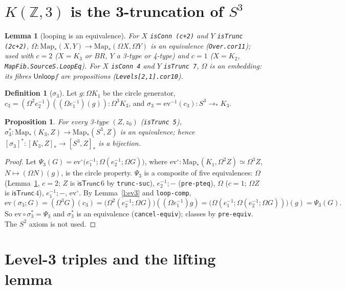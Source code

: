 \documentclass[11pt]{amsart}
\newtheorem{proposition}[theorem]{Proposition}
\newtheorem{lemma}[theorem]{Lemma}
\theoremstyle{definition}
\newtheorem{definition}[theorem]{Definition}
\theoremstyle{remark}
\newcommand{\Om}{\Omega}
\newcommand{\Map}{\mathrm{Map}_*}
\newcommand{\Z}{\mathbb{Z}}
\newcommand{\code}[1]{\texttt{#1}}
\newcommand{\cT}{\mathsf{isTrunc}}
\newcommand{\lp}{\Omega}
\newcommand{\hc}[2]{[#1,#2]_*}
\newcommand{\cls}[1]{[#1]}
\newcommand{\Unl}{\mathsf{Unloop}}
\begin{document}
\section{$K(\Z,3)$ is the 3-truncation of $S^3$}

\begin{lemma}[looping is an equivalence]\label{l:loopeq3}
For $X$ \code{isConn (c+2)} and $Y$ \code{isTrunc (2c+2)}, $\lp:\Map(X,Y)\to
\Map(\Om X,\Om Y)$ is an equivalence (\code{Over.cor11}); used with $c=2$
($X=K_3$ or $BR$, $Y$ a 3-type or 4-type) and $c=1$ ($X=K_2$,
\code{MapFib.SourceS.LoopEq}). For $X$ \code{isConn 4} and $Y$
\code{isTrunc 7}, $\lp$ is an embedding: its fibres $\Unl f$ are propositions
(\code{Levels[2,1].cor10}).
\end{lemma}

\begin{definition}[$\sigma_3$]\label{d:sigma3}
Let $g:\Om K_1$ be the circle generator, $c_3=(\lp^2e_2^{-1})((\lp e_1^{-1})(g)):\Om^3K_3$,
and $\sigma_3=\mathrm{ev}^{-1}(c_3):S^3\to_*K_3$.
\end{definition}

\begin{proposition}\label{p:sigma3}
For every 3-type $(Z,z_0)$ (\code{isTrunc 5}), $\sigma_3^*:\Map(K_3,Z)\to\Map(S^3,Z)$
is an equivalence; hence $\cls{\sigma_3}^*:\hc{K_3}Z\to\hc{S^3}Z$ is a bijection.
\end{proposition}
\begin{proof}
Let $\Psi_3(G)=\mathrm{ev}^\circ\bigl(e_1^{-1};\lp(e_2^{-1};\lp G)\bigr)$, where
$\mathrm{ev}^\circ:\Map(K_1,\Om^2Z)\simeq\Om^3Z$, $N\mapsto(\lp N)(g)$, is the
circle property. $\Psi_3$ is a composite of five equivalences:
$\lp$ (Lemma~\ref{l:loopeq3}, $c=2$; $Z$ is $\cT\,6$ by \code{trunc-suc}),
$e_2^{-1};-$ (\code{pre-pteq}), $\lp$ ($c=1$; $\Om Z$ is $\cT\,4$),
$e_1^{-1};-$, $\mathrm{ev}^\circ$. By Lemma~\ref{l:ev3} and \code{loop-comp},
\[\mathrm{ev}(\sigma_3;G)=(\lp^3G)(c_3)=\bigl(\lp^2(e_2^{-1};\lp G)\bigr)((\lp e_1^{-1})g)
=\bigl(\lp(e_1^{-1};\lp(e_2^{-1};\lp G))\bigr)(g)=\Psi_3(G).\]
So $\mathrm{ev}\circ\sigma_3^*=\Psi_3$ and $\sigma_3^*$ is an equivalence
(\code{cancel-equiv}); classes by \code{pre-equiv}. The $S^2$ axiom is not used.
\end{proof}

\section{Level-3 triples and the lifting lemma}
\end{document}
